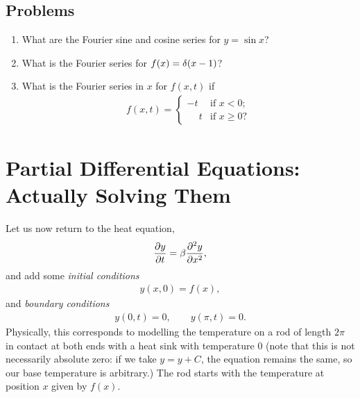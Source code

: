 \documentclass{book}
\begin{document}

\section{Problems}

\begin{enumerate}
  \item
    What are the Fourier sine and cosine series for
    $y=\sin x$?
  \item
    What is the Fourier series for $ f(x) = \delta(x-1)$?

  \item What is the Fourier series in $x$ for $f(x,t)$ if
    \begin{align}
    f(x,t) =
    \left\{ \begin{array}{ll}
      -t           & \mbox{if $x < 0$};\\
      \phantom{-}t & \mbox{if $x \geq 0$}?
    \end{array} \right.
    \end{align}

\end{enumerate}


\chapter{Partial Differential Equations: Actually Solving Them}

Let us now return to the heat equation,
\begin{align}
\label{heateq}
\frac{\partial y}{\partial t} = \beta \frac{\partial^2y}{\partial x^2},
\end{align}
and add some \emph{initial conditions}
\begin{align*}
y(x,0)=f(x),
\end{align*}
and \emph{boundary conditions}
\begin{align}
\label{homdibc}
y(0,t)=0, \qquad y(\pi,t)=0.
\end{align}
Physically, this corresponds to modelling the temperature on a rod of length
$2\pi$ in contact at both ends with a heat sink with temperature $0$ (note
that this is not necessarily absolute zero: if we take $y=y+C$, the equation
remains the same, so our base temperature is arbitrary.) The
rod starts with the temperature at position $x$ given by $f(x)$.
\end{document}
